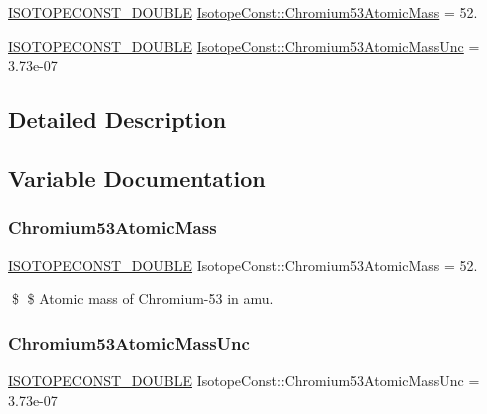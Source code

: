 \begin{DoxyCompactItemize}
\item 
\mbox{\hyperlink{group___isotope_const-_macros_ga8f45a7272ce02c0b4c65c44636ed719a}{I\+S\+O\+T\+O\+P\+E\+C\+O\+N\+S\+T\+\_\+\+D\+O\+U\+B\+LE}} \mbox{\hyperlink{group___isotope_const-_chromium-_cr53_ga309a3722506c3d628d8b966312ecc56f}{Isotope\+Const\+::\+Chromium53\+Atomic\+Mass}} = 52.
\item 
\mbox{\hyperlink{group___isotope_const-_macros_ga8f45a7272ce02c0b4c65c44636ed719a}{I\+S\+O\+T\+O\+P\+E\+C\+O\+N\+S\+T\+\_\+\+D\+O\+U\+B\+LE}} \mbox{\hyperlink{group___isotope_const-_chromium-_cr53_ga577dbf55b356891f5efe4ad8a2e7620b}{Isotope\+Const\+::\+Chromium53\+Atomic\+Mass\+Unc}} = 3.\+73e-\/07
\end{DoxyCompactItemize}


\subsection{Detailed Description}


\subsection{Variable Documentation}
\mbox{\label{group___isotope_const-_chromium-_cr53_ga309a3722506c3d628d8b966312ecc56f}} 
\subsubsection{\texorpdfstring{Chromium53\+Atomic\+Mass}{Chromium53AtomicMass}}
{\footnotesize\ttfamily \mbox{\hyperlink{group___isotope_const-_macros_ga8f45a7272ce02c0b4c65c44636ed719a}{I\+S\+O\+T\+O\+P\+E\+C\+O\+N\+S\+T\+\_\+\+D\+O\+U\+B\+LE}} Isotope\+Const\+::\+Chromium53\+Atomic\+Mass = 52.}

\$ \$ Atomic mass of Chromium-\/53 in amu. \mbox{\label{group___isotope_const-_chromium-_cr53_ga577dbf55b356891f5efe4ad8a2e7620b}} 
\subsubsection{\texorpdfstring{Chromium53\+Atomic\+Mass\+Unc}{Chromium53AtomicMassUnc}}
{\footnotesize\ttfamily \mbox{\hyperlink{group___isotope_const-_macros_ga8f45a7272ce02c0b4c65c44636ed719a}{I\+S\+O\+T\+O\+P\+E\+C\+O\+N\+S\+T\+\_\+\+D\+O\+U\+B\+LE}} Isotope\+Const\+::\+Chromium53\+Atomic\+Mass\+Unc = 3.\+73e-\/07}

